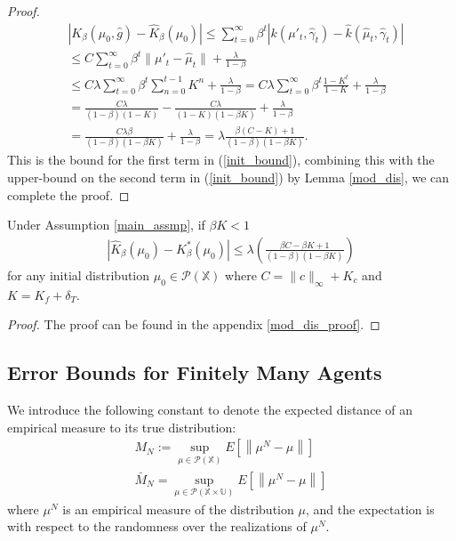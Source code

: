 \documentclass[twoside,11pt]{article}
\def\P{{\mathcal P}}
\begin{document}
\begin{proof}
\begin{align*}
& \left| K_\beta(\mu_0,\hat{g})  - \hat{K}_\beta(\mu_0)\right| \leq \sum_{t=0}^\infty \beta^t \left| k(\mu'_t,\hat{\gamma}_t) - \hat{k}(\hat{\mu}_t,\hat{\gamma}_t) \right| \\
&\leq  C \sum_{t=0}^\infty \beta^t    \|\mu'_t - \hat{\mu}_t\| +  \frac{\lambda}{1-\beta}\\
&\leq C \lambda \sum_{t=0}^\infty \beta^t     \sum_{n=0}^{t-1} K^n +  \frac{\lambda}{1-\beta}= C\lambda \sum_{t=0}^\infty \beta^t \frac{1-K^t}{1-K} + \frac{\lambda}{1-\beta}\\
& = \frac{C\lambda}{(1-\beta)(1-K)}  - \frac{C\lambda}{(1-K)(1-\beta K)} + \frac{\lambda}{1-\beta}\\
&= \frac{C\lambda \beta}{(1-\beta)(1-\beta K)} + \frac{\lambda}{1-\beta} = \lambda\frac{\beta (C-K) +1}{(1-\beta)(1-\beta K)}.
\end{align*}
This is the bound for the first term in (\ref{init_bound}), combining this with the upper-bound on the second term in (\ref{init_bound}) by Lemma \ref{mod_dis}, we can complete the proof.
\end{proof}

\begin{lemma}\label{mod_dis}
Under Assumption \ref{main_assmp}, if $\beta K <1$
\begin{align*}
\left| \hat{K}_\beta (\mu_0) - K_\beta^*(\mu_0)\right| \leq \lambda\left( \frac{\beta C- \beta K +1}{(1-\beta)(1-\beta K)}  \right)
\end{align*}
for any initial distribution $\mu_0\in\P(\mathds{X})$ where $C=\|c\|_\infty + K_c$ and $K=K_f + \delta_T$.
\end{lemma}
\begin{proof}
The proof can be found in the appendix \ref{mod_dis_proof}.
\end{proof}

\subsection{Error Bounds for Finitely Many Agents}

We introduce the following constant to denote the expected distance of an empirical measure to its true distribution:
\begin{align}\label{emp_bound}
M_N:= \sup_{\mu\in\P(\mathds{X})} E\left[ \left\|\mu^N - \mu\right\|  \right]\\
\bar{M}_N = \sup_{\mu\in\P(\mathds{X} \times \mathds{U})} E\left[ \left\|\mu^N - \mu\right\|  \right]
\end{align}
where $\mu^N$ is an empirical measure of the distribution $\mu$, and the expectation is with respect to the randomness over the realizations of $\mu^N$.
\end{document}
